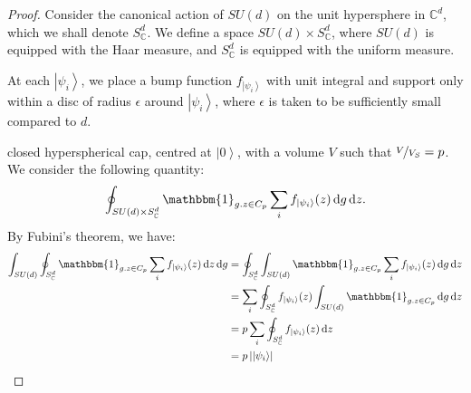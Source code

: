 \documentclass{amsart}
\theoremstyle{definition}
\newcommand{\ket}[1]{{\left\vert{#1}\right\rangle}}
\newcommand*\dif{\mathop{}\!\mathrm{d}}
\begin{document}
\begin{proof}
Consider the canonical action of $SU(d)$ on the unit hypersphere in $\mathbb{C}^d$, which we shall denote $S_\mathbb{C}^d$. We define a space $SU(d)\times S_\mathbb{C}^d$, where $SU(d)$ is equipped with the Haar measure, and $S_\mathbb{C}^d$ is equipped with the uniform measure.

At each $\ket{\psi_i}$, we place a bump function $f_\ket{\psi_i}$ with unit integral and support only within a disc of radius $\epsilon$ around $\ket{\psi_i}$, where $\epsilon$ is taken to be sufficiently small compared to $d$.

closed hyperspherical cap, centred at $\ket{0}$, with a volume $V$ such that $\nicefrac{V}{V_S}=p$. We consider the following quantity:
\begin{equation}
\oint_{SU(d)\times S_\mathbb{C}^d} \mathbbm{1}_{g.z\in C_p} \sum_i f_\ket{\psi_i}(z) \dif g\dif z.
\end{equation}
By Fubini's theorem, we have:
\begin{align}
\int_{SU(d)} \oint_{S_\mathbb{C}^d} \mathbbm{1}_{g.z\in C_p} \sum_i f_\ket{\psi_i}(z) \dif z \dif g &= \oint_{S_\mathbb{C}^d} \int_{SU(d)}  \mathbbm{1}_{g.z\in C_p} \sum_i f_\ket{\psi_i}(z) \dif g \dif z \\
 &= \sum_i\oint_{S_\mathbb{C}^d}f_\ket{\psi_i}(z)  \int_{SU(d)} \mathbbm{1}_{g.z\in C_p} \dif g \dif z \label{eqn:1} \\
 &= p\sum_i\oint_{S_\mathbb{C}^d}f_\ket{\psi_i}(z)  \dif z \label{eqn:2} \\
&= p\left|\ket{\psi_i}\right|
\end{align}




\end{proof}
\end{document}
